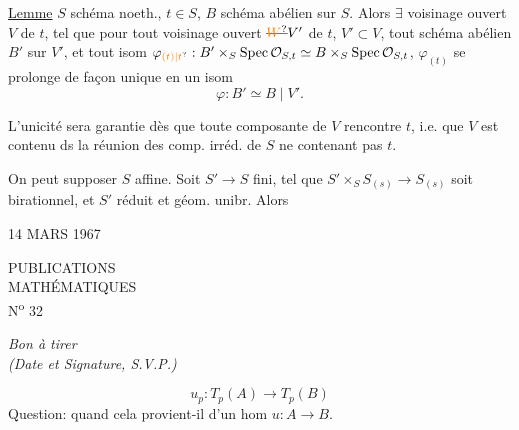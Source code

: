 \uline{Lemme} $S$ schéma noeth., \inserted{\deleted{[réduit]}} $t\in S$, $B$ schéma abélien sur $S$. Alors $\exists$ voisinage ouvert $V$ de $t$,  tel que pour  tout voisinage ouvert $\deleted{\unsure{W}}V'$ de $t$, $V'\subset V$, tout schéma abélien $B'$ sur $V'$, et tout isom $\varphi_{\unsure{(t)|t}}: B'\times_S\operatorname{Spec}\mathcal O_{S,t}\simeq B\times_S\operatorname{Spec}\mathcal O_{S,t}$, $\varphi_{(t)}$ se prolonge de façon unique en un isom
\[
\varphi:B'\simeq B\mid V'.
\]

L'unicité sera garantie dès que toute composante  de $V$ rencontre $t$, i.e. que $V$ est contenu ds la réunion des comp. irréd. de $S$ ne contenant pas $t$.

 On peut supposer $S$ affine.  Soit $S'\to S$ fini, tel que $S'\times_S S_{(s)}\to S_{(s)}$ soit birationnel, et $S'$ réduit et géom. unibr. Alors

\hfill 14 MARS 1967


\begin{center}
PUBLICATIONS\\
MATHÉMATIQUES\\
N\textsuperscript{o} 32
\end{center}

\begin{flushright}
\textit{Bon à tirer}\\
\textit{(Date et Signature, S.V.P.)}
\end{flushright}

\[
u_p:T_p(A)\to T_p(B)
\]
Question: quand cela provient-il d'un hom $u:A\to B$.

